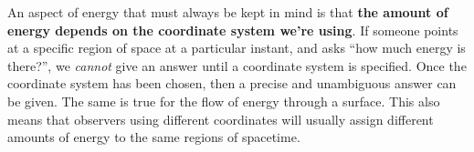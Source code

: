 \documentclass[a4paper,12pt,%
onecolumn,oneside,titlepage,%
british%
]{memoir}
\renewcommand*{\|}[1][]{\nonscript\:#1\vert\nonscript\:\mathopen{}}
\begin{document}
An aspect of energy that must always be kept in mind is that \textbf{the amount of energy depends on the coordinate system we're using}. If someone points at a specific region of space at a particular instant, and asks \enquote{how much energy is there?}, we \emph{cannot} give an answer until a coordinate system is specified. Once the coordinate system has been chosen, then a precise and unambiguous answer can be given. The same is true for the flow of energy through a surface. This also means that observers using different coordinates will usually assign different amounts of energy to the same regions of spacetime.
%
\end{document}
